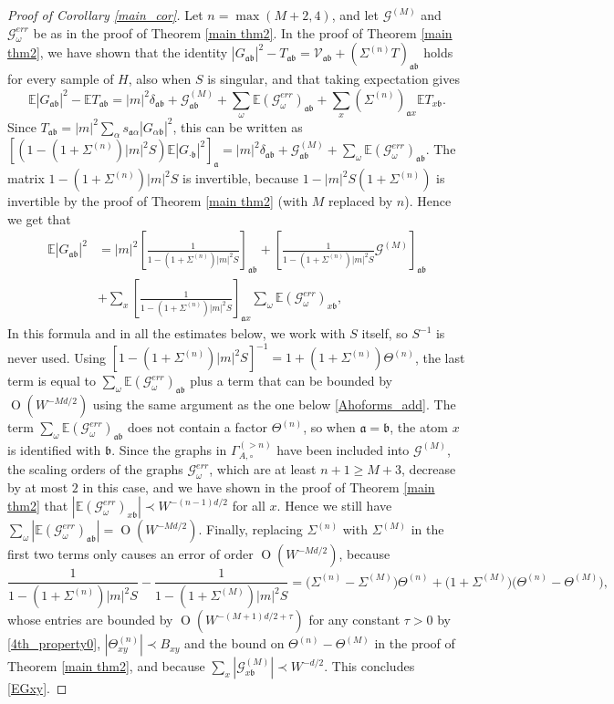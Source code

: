 \documentclass{article}
\newcommand{\1}{\mathds{1}}
\numberwithin{equation}{section}
\newcommand{\al}{\alpha}
\newcommand{\fa}{{\mathfrak a}}
\newcommand{\fb}{{\mathfrak b}}
\renewcommand{\cal}{\mathcal}
\renewcommand{\geq}{\geqslant}
\renewcommand{\ge}{\geq}
\newcommand{\E}{\mathbb{E}}
\DeclareMathOperator{\OO}{O}
\theoremstyle{plain} %
\theoremstyle{remark}
\newcommand{\wtSdelta}{\Sigma}
\newcommand{\wtSdeltan}{\Sigma^{(n)}}
\begin{document}
\begin{proof}[Proof of Corollary \ref{main_cor}]
Let $n=\max(M+2,4)$, and let $\cal G^{(M)}$ and $\cal G^{err}_\omega$ be as in the proof of Theorem \ref{main thm2}. In the proof of Theorem \ref{main thm2}, we have shown that the identity $|G_{\fa\fb}|^2-T_{\fa\fb}=\cal V_{\fa\fb}+(\wtSdeltan T)_{\fa\fb}$ holds for every sample of $H$, also when $S$ is singular, and that taking expectation gives
$$\E|G_{\fa\fb}|^2-\E T_{\fa\fb}=|m|^2\delta_{\fa\fb}+\cal G^{(M)}_{\fa\fb}+\sum_\omega\E\left(\cal G^{err}_\omega\right)_{\fa\fb}+\sum_x(\wtSdeltan)_{\fa x}\E T_{x\fb}.$$
Since $T_{\fa\fb}=|m|^2\sum_\al s_{\fa\al}|G_{\al\fb}|^2$, this can be written as $[(1-(1+\wtSdeltan)|m|^2S)\E|G_{\cdot\fb}|^2]_{\fa}=|m|^2\delta_{\fa\fb}+\cal G^{(M)}_{\fa\fb}+\sum_\omega\E(\cal G^{err}_\omega)_{\fa\fb}$. The matrix $1-(1+\wtSdeltan)|m|^2S$ is invertible, because $1-|m|^2S(1+\wtSdeltan)$ is invertible by the proof of Theorem \ref{main thm2} (with $M$ replaced by $n$). Hence we get that
\begin{align*}
\E |G_{\fa\fb}|^2 & = |m|^2 \left[ \frac{1}{1-\left(1+\wtSdeltan\right)|m|^2  S} \right]_{\fa\fb} + \left[  \frac{1}{1-\left(1+\wtSdeltan \right)|m|^2  S} \cal G^{(M)} \right]_{\fa\fb} \\
&+  \sum_{x}  \left[  \frac{1}{1-\left(1+\wtSdeltan \right)|m|^2  S}\right]_{\fa x} \sum_{\omega}\E\left(\cal G^{err}_\omega \right)_{x\fb},
\end{align*} 
In this formula and in all the estimates below, we work with $S$ itself, so $S^{-1}$ is never used. Using $[1-(1+\wtSdeltan)|m|^2S]^{-1}=1+(1+\wtSdeltan)\Theta^{(n)}$, the last term is equal to $\sum_{\omega}\E(\cal G^{err}_\omega)_{\fa\fb}$ plus a term that can be bounded by $\OO(W^{-Md/2})$ using the same argument as the one below \eqref{Ahoforms_add}. The term $\sum_{\omega}\E(\cal G^{err}_\omega)_{\fa\fb}$ does not contain a factor $\Theta^{(n)}$, so when $\fa=\fb$, the atom $x$ is identified with $\fb$. Since the graphs in $\Gamma_{A,\circ}^{(>n)}$ have been included into $\cal G^{(M)}$, the scaling orders of the graphs $\cal G^{err}_\omega$, which are at least $n+1\ge M+3$, decrease by at most $2$ in this case, and we have shown in the proof of Theorem \ref{main thm2} that $|\E(\cal G^{err}_\omega)_{x\fb}|\prec W^{-(n-1)d/2}$ for all $x$. Hence we still have $\sum_{\omega}|\E(\cal G^{err}_\omega)_{\fa\fb}|=\OO(W^{-Md/2})$. Finally, replacing $\wtSdeltan$ with $\wtSdelta^{(M)}$ in the first two terms only causes an error of order $\OO(W^{-Md/2})$, because 
$$\frac{1}{1-(1+\wtSdeltan)|m|^2S}-\frac{1}{1-(1+\wtSdelta^{(M)})|m|^2S}=\big(\wtSdeltan-\wtSdelta^{(M)}\big)\Theta^{(n)}+\big(1+\wtSdelta^{(M)}\big)\big(\Theta^{(n)}-\Theta^{(M)}\big),$$ 
whose entries are bounded by $\OO(W^{-(M+1)d/2+\tau})$ for any constant $\tau>0$ by \eqref{4th_property0}, $|\Theta^{(n)}_{xy}|\prec B_{xy}$ and the bound on $\Theta^{(n)}-\Theta^{(M)}$ in the proof of Theorem \ref{main thm2}, and because $\sum_x|\cal G^{(M)}_{x\fb}|\prec W^{-d/2}$. This concludes \eqref{EGxy}.
\end{proof}
\end{document}
